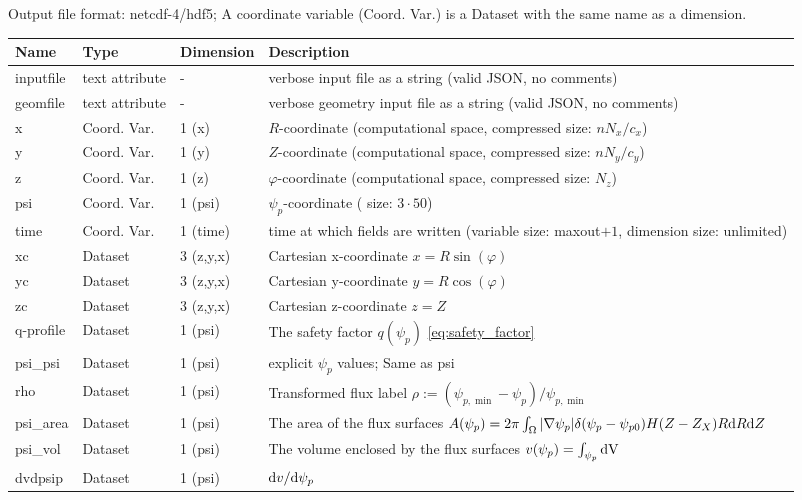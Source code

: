 Output file format: netcdf-4/hdf5; A coordinate variable (Coord. Var.) is a Dataset with the same name as a dimension.

\begin{longtable}{lll>{\RaggedRight}p{7cm}}
\toprule
\rowcolor{gray!50}\textbf{Name} &  \textbf{Type} & \textbf{Dimension} & \textbf{Description}  \\ \midrule
inputfile  &     text attribute & - & verbose input file as a string (valid JSON, no comments) \\
geomfile   &     text attribute & - & verbose geometry input file as a string (valid JSON, no comments) \\
x                & Coord. Var. & 1 (x) & $R$-coordinate (computational space, compressed size: $nN_x/c_x$)\\
y                & Coord. Var. & 1 (y) & $Z$-coordinate (computational space, compressed size: $nN_y/c_y$)\\
z                & Coord. Var. & 1 (z) & $\varphi$-coordinate (computational space, compressed size: $N_z$)\\
psi              & Coord. Var. & 1 (psi) & $\psi_p$-coordinate ( size: $3\cdot 50$) \\
time             & Coord. Var. & 1 (time)& time at which fields are written (variable size: maxout$+1$, dimension size: unlimited) \\
xc           & Dataset & 3 (z,y,x) & Cartesian x-coordinate $x=R\sin(\varphi)$ \\
yc           & Dataset & 3 (z,y,x) & Cartesian y-coordinate $y=R\cos(\varphi)$\\
zc           & Dataset & 3 (z,y,x) & Cartesian z-coordinate $z=Z$ \\
q-profile        & Dataset & 1 (psi) & The safety factor $q(\psi_p)$ \eqref{eq:safety_factor} \\
psi\_psi         & Dataset & 1 (psi) & explicit $\psi_p$ values; Same as psi \\
rho              & Dataset & 1 (psi) & Transformed flux label $\rho:= (\psi_{p,\min} - \psi_p)/\psi_{p,\min}$ \\
psi\_area        & Dataset & 1 (psi) & The area of the flux surfaces $A(\psi_p) = 2\pi \int_\Omega |\nabla\psi_p| \delta(\psi_p - \psi_{p0}) H(Z-Z_X) R\mathrm{d} R\mathrm{d} Z$ \\
psi\_vol         & Dataset & 1 (psi) & The volume enclosed by the flux surfaces $v(\psi_p) = \int_{\psi_p} \mathrm{dV}\, $ \\
dvdpsip          & Dataset & 1 (psi) & $\mathrm{d} v/\mathrm{d}\psi_p$ \\

\end{longtable}
